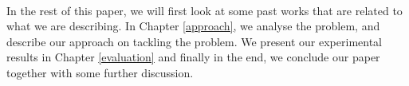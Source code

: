  
\paragraph{}
In the rest of this paper, we will first look at some past works that are related to what we are describing. In Chapter \ref{approach}, we analyse the problem, and describe our approach on tackling the problem. We present our experimental results in Chapter \ref{evaluation} and finally in the end, we conclude our paper together with some further discussion.
